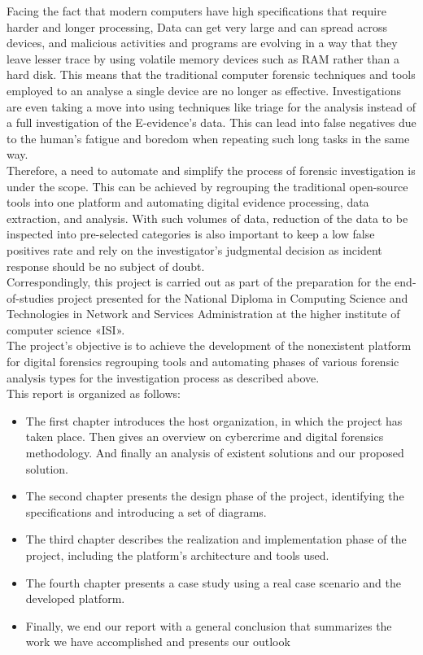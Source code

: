 Facing the fact that modern computers have high specifications that require harder and longer processing, Data can get very large and can spread across devices, and malicious activities and programs are evolving in a way that they leave lesser trace by using volatile memory devices such as RAM rather than a hard disk. This means that the traditional computer forensic techniques and tools employed to an analyse a single device are no longer as effective. Investigations are even taking a move into using techniques like triage for the analysis instead of a full investigation of the E-evidence's data. This can lead into false negatives due to the human's fatigue and boredom when repeating such long tasks in the same way.\\
Therefore, a need to automate and simplify the process of forensic investigation is under the scope. This can be achieved by regrouping the traditional open-source tools into one platform and automating digital evidence processing, data extraction, and analysis. With such volumes of data, reduction of the data to be inspected into pre-selected categories is also important to keep a low false positives rate and rely on the investigator's judgmental decision as incident response should be no subject of doubt.\\
Correspondingly, this project is carried out as part of the preparation for the end-of-studies project presented for the National Diploma in Computing Science and Technologies in Network and Services Administration at the higher institute of computer science «ISI».\\
The project's objective is to achieve the development of the nonexistent platform for digital forensics regrouping tools and automating phases of various forensic analysis types for the investigation process as described above.\\
This report is organized as follows:
\begin{itemize}
    \item The first chapter introduces the host organization, in which the project has taken place. Then gives an overview on cybercrime and digital forensics methodology. And finally an analysis of existent solutions and our proposed solution.
    \item The second chapter presents the design phase of the project, identifying the specifications and introducing a set of diagrams.
    \item The third chapter describes the realization and implementation phase of the project, including the platform's architecture and tools used.
    \item The fourth chapter presents a case study using a real case scenario and the developed platform.
    \item Finally, we end our report with a general conclusion that summarizes the work we have accomplished and presents our outlook
\end{itemize}